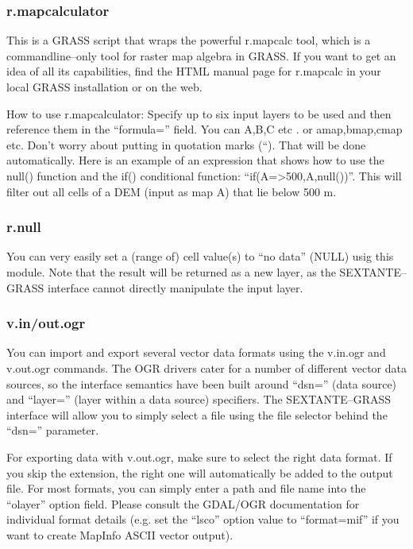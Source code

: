 \subsubsection{r.mapcalculator}

This is a GRASS script that wraps the powerful r.mapcalc tool, which is a commandline--only tool for raster map algebra in GRASS. If you want to get an idea of all its capabilities, find the HTML manual page for r.mapcalc in your local GRASS installation or on the web.

How to use r.mapcalculator: Specify up to six input layers to be used and then reference them in the ``formula='' field. You can A,B,C etc . or amap,bmap,cmap etc. Don't worry about putting in quotation marks (``). That will be done automatically. Here is an example of an expression that shows how to use the null() function and the if() conditional function: ``if(A=>500,A,null())''. This will filter out all cells of a DEM (input as map A) that lie below 500 m.

\subsubsection{r.null}

You can very easily set a (range of) cell value(s) to ``no data'' (NULL) usig this module. Note that the result will be returned as a new layer, as the SEXTANTE--GRASS interface cannot directly manipulate the input layer.

\subsubsection{v.in/out.ogr}

You can import and export several vector data formats using the v.in.ogr and v.out.ogr commands. The OGR drivers cater for a number of different vector data sources, so the interface semantics have been built around ``dsn='' (data source) and ``layer='' (layer within a data source) specifiers. The SEXTANTE--GRASS interface will allow you to simply select a file using the file selector behind the ``dsn='' parameter.

For exporting data with v.out.ogr, make sure to select the right data format. If you skip the extension, the right one will automatically be added to the output file. For most formats, you can simply enter a path and file name into the ``olayer'' option field. Please consult the GDAL/OGR documentation for individual format details (e.g. set the ``lsco'' option value to ``format=mif'' if you want to create MapInfo ASCII vector output).

